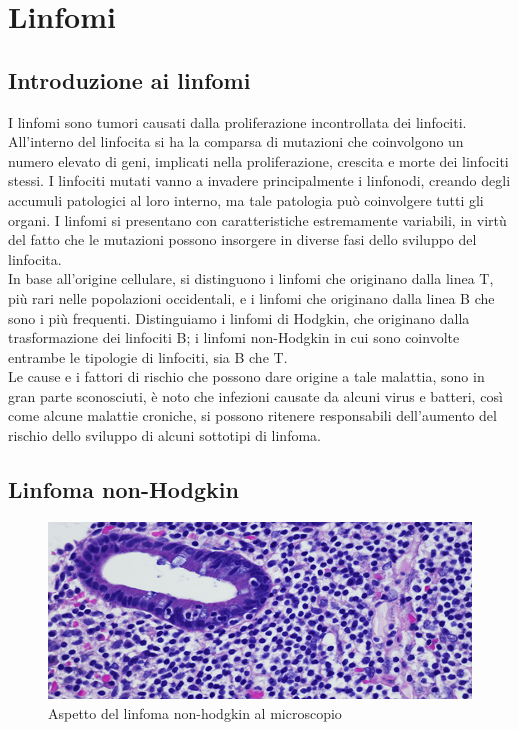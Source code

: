 \chapter{Linfomi}

\section{Introduzione ai linfomi}
I linfomi sono tumori causati dalla proliferazione incontrollata dei linfociti.
All’interno del linfocita si ha la comparsa di mutazioni che coinvolgono un numero elevato di geni, 
implicati nella proliferazione, crescita e morte dei linfociti stessi.
I linfociti mutati vanno a invadere principalmente i linfonodi, creando degli accumuli patologici al loro interno, 
ma tale patologia può coinvolgere tutti gli organi.  
I linfomi si presentano con caratteristiche estremamente variabili, in virtù del fatto che le mutazioni 
possono insorgere in diverse fasi dello sviluppo del linfocita\cite{LINFOMIAIL}.\\

In base all’origine cellulare, si distinguono i linfomi che originano dalla linea T, 
più rari nelle popolazioni occidentali, e i linfomi che originano dalla linea B che sono i più frequenti. 
Distinguiamo i linfomi di Hodgkin, che originano dalla trasformazione dei linfociti B; 
i linfomi non-Hodgkin in cui sono coinvolte entrambe le tipologie di linfociti, sia B che T.\\

Le cause e i fattori di rischio che possono dare origine a tale malattia, sono in gran parte sconosciuti, 
è noto che infezioni causate da alcuni virus e batteri, così come alcune malattie croniche, 
si possono ritenere responsabili dell’aumento del rischio dello sviluppo di alcuni sottotipi di linfoma\cite{LINFOMIAIL}.\\

\section{Linfoma non-Hodgkin}

\begin{figure}[h]
    \begin{center}
    \includegraphics[width=0.6\columnwidth]{img/Linfoma-non-Hodgkin.jpeg}
    \end{center}
    \caption[Aspetto del linfoma non-hodgkin al microscopio]{Aspetto del linfoma non-hodgkin al microscopio
    \cite{img3}}

\end{figure}

